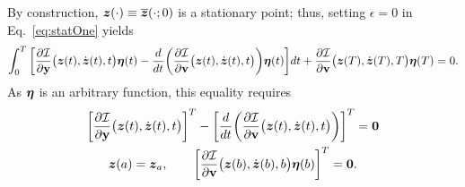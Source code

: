 \documentclass[3p,computermodern,10pt]{elsarticle}
\begin{document}
\begin{appendices}
By construction, $\boldsymbol z(\cdot) \equiv \overline{\boldsymbol z}(\cdot;0)$ is a stationary
point; thus, setting $\epsilon = 0$ in Eq.~\eqref{eq:statOne} yields
\begin{equation}
  \int_0^T  \bigg[\frac{\partial \mathcal{I}  }{\partial \mathbf{y} } \big(\boldsymbol z(t),\dot{\boldsymbol z}(t),t \big) \boldsymbol \eta(t) - \frac{d}{dt}\bigg( \frac{\partial \mathcal{I}}{\partial \mathbf{{v}} }  \big(\boldsymbol z(t),\dot{\boldsymbol z}(t),t \big) \bigg) \boldsymbol \eta(t) \bigg]dt + \frac{\partial \mathcal{I}}{\partial \mathbf{{v}}} \big(\boldsymbol z(T),\dot{\boldsymbol z}(T) ,T\big) \boldsymbol \eta(T)  = 0. 
\end{equation}
As $\boldsymbol \eta$ is an arbitrary function, this equality requires
\begin{gather}\label{eq:euler_lagrange_appendix}
\bigg[ \frac{\partial \mathcal{I}  }{\partial \mathbf{y} }
	\big(\boldsymbol z(t),\dot{\boldsymbol z}(t) ,t\big) \bigg]^T - \bigg[ \frac{d}{dt}\bigg(
	\frac{\partial \mathcal{I}}{\partial \mathbf{{v}} }
	\big(\boldsymbol z(t),\dot{\boldsymbol z}(t),t \big) \bigg) \bigg]^T = \boldsymbol 0  \\
\boldsymbol z(a) = \boldsymbol z_a, \qquad \bigg[ \frac{\partial \mathcal{I}}{\partial \mathbf{{v}}} \big(\boldsymbol z(b),\dot{\boldsymbol z}(b),b \big) \boldsymbol \eta(b) \bigg]^T = \boldsymbol 0.
\end{gather}
\end{appendices}
\end{document}
